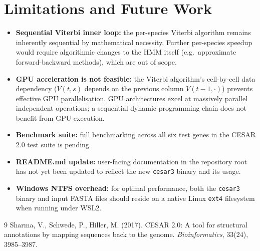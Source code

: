 \documentclass[12pt,a4paper]{article}
\begin{document}
\section{Limitations and Future Work}

\begin{itemize}
  \item \textbf{Sequential Viterbi inner loop:} the per-species Viterbi algorithm
        remains inherently sequential by mathematical necessity. Further per-species
        speedup would require algorithmic changes to the HMM itself (e.g.\ approximate
        forward-backward methods), which are out of scope.
  \item \textbf{GPU acceleration is not feasible:} the Viterbi algorithm's cell-by-cell
        data dependency ($V(t,s)$ depends on the previous column $V(t-1,\cdot)$)
        prevents effective GPU parallelisation. GPU architectures excel at massively
        parallel independent operations; a sequential dynamic programming chain does
        not benefit from GPU execution.
  \item \textbf{Benchmark suite:} full benchmarking across all six test genes in the
        CESAR 2.0 test suite is pending.
  \item \textbf{README.md update:} user-facing documentation in the repository root
        has not yet been updated to reflect the new \texttt{cesar3} binary and its usage.
  \item \textbf{Windows NTFS overhead:} for optimal performance, both the \texttt{cesar3}
        binary and input FASTA files should reside on a native Linux \texttt{ext4}
        filesystem when running under WSL2.
\end{itemize}

\begin{thebibliography}{9}
Sharma, V., Schwede, P., Hiller, M. (2017).
CESAR 2.0: A tool for structural annotations by mapping sequences back to the genome.
\textit{Bioinformatics}, 33(24), 3985--3987.
\end{thebibliography}
\end{document}
